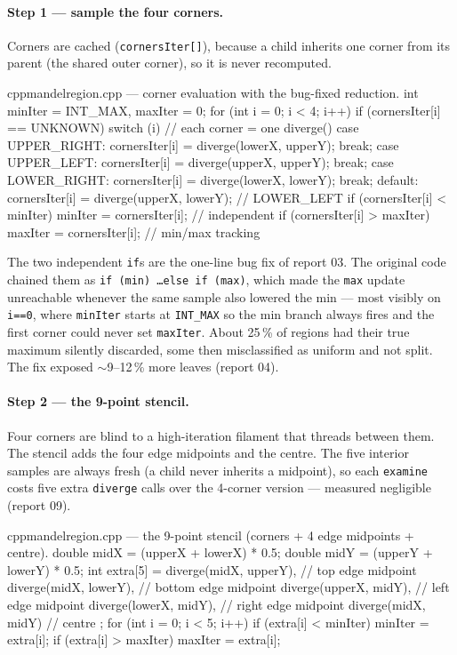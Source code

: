 \documentclass[
	english,
	letterpaper, oneside
]{article}
\begin{document}
\paragraph{Step 1 --- sample the four corners.} Corners are cached
(\texttt{cornersIter[]}), because a child inherits one corner from its parent (the
shared outer corner), so it is never recomputed.

\begin{sourcecode}{cpp}{mandelregion.cpp --- corner evaluation with the bug-fixed reduction.}
int minIter = INT_MAX, maxIter = 0;
for (int i = 0; i < 4; i++) {
    if (cornersIter[i] == UNKNOWN) {
        switch (i) {                                   // each corner = one diverge()
          case UPPER_RIGHT: cornersIter[i] = diverge(lowerX, upperY); break;
          case UPPER_LEFT:  cornersIter[i] = diverge(upperX, upperY); break;
          case LOWER_RIGHT: cornersIter[i] = diverge(lowerX, lowerY); break;
          default:          cornersIter[i] = diverge(upperX, lowerY);  // LOWER_LEFT
        }
    }
    if (cornersIter[i] < minIter) minIter = cornersIter[i];   // independent
    if (cornersIter[i] > maxIter) maxIter = cornersIter[i];   // min/max tracking
}
\end{sourcecode}

The two independent \texttt{if}s are the one-line bug fix of report 03. The
original code chained them as \texttt{if (min) \ldots else if (max)}, which made
the \texttt{max} update unreachable whenever the same sample also lowered the min
--- most visibly on \texttt{i==0}, where \texttt{minIter} starts at
\texttt{INT\_MAX} so the min branch always fires and the first corner could never
set \texttt{maxIter}. About 25\,\% of regions had their true maximum silently
discarded, some then misclassified as uniform and not split. The fix exposed
$\sim$9--12\,\% more leaves (report 04).

\paragraph{Step 2 --- the 9-point stencil.} Four corners are blind to a
high-iteration filament that threads between them. The stencil adds the
four edge midpoints and the centre. The five interior samples are always fresh (a
child never inherits a midpoint), so each \texttt{examine} costs five extra
\texttt{diverge} calls over the 4-corner version --- measured negligible (report 09).

\begin{sourcecode}{cpp}{mandelregion.cpp --- the 9-point stencil (corners + 4 edge midpoints + centre).}
double midX = (upperX + lowerX) * 0.5;
double midY = (upperY + lowerY) * 0.5;
int extra[5] = {
    diverge(midX,   upperY),   // top edge midpoint
    diverge(midX,   lowerY),   // bottom edge midpoint
    diverge(upperX, midY),     // left edge midpoint
    diverge(lowerX, midY),     // right edge midpoint
    diverge(midX,   midY)      // centre
};
for (int i = 0; i < 5; i++) {
    if (extra[i] < minIter) minIter = extra[i];
    if (extra[i] > maxIter) maxIter = extra[i];
}
\end{sourcecode}
\end{document}
